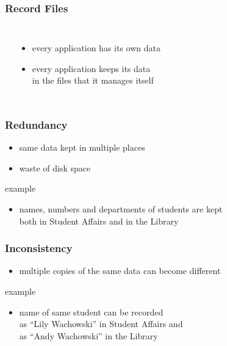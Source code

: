 \documentclass[dvipsnames]{beamer}
\theoremstyle{plain}
\begin{document}
\begin{frame}
  \frametitle{Record Files}

  \begin{columns}[b]
    \begin{center}
    \end{center}

    \begin{itemize}
      \item every application has its own data
      \item every application keeps its data\\
        in the files that it manages itself
    \end{itemize}
  \end{columns}
\end{frame}

\begin{frame}
  \frametitle{Redundancy}

  \begin{itemize}
    \item same data kept in multiple places
    \item waste of disk space
  \end{itemize}

  \medskip
  \begin{exampleblock}{example}
    \begin{itemize}
      \item names, numbers and departments of students are kept\\
        both in Student Affairs and in the Library
    \end{itemize}
  \end{exampleblock}
\end{frame}

\begin{frame}
  \frametitle{Inconsistency}

  \begin{itemize}
    \item multiple copies of the same data can become different
  \end{itemize}

  \medskip
  \begin{exampleblock}{example}
    \begin{itemize}
      \item name of same student can be recorded\\
        as ``Lily Wachowski'' in Student Affairs and\\
        as ``Andy Wachowski'' in the Library
    \end{itemize}
  \end{exampleblock}
\end{frame}
\end{document}
